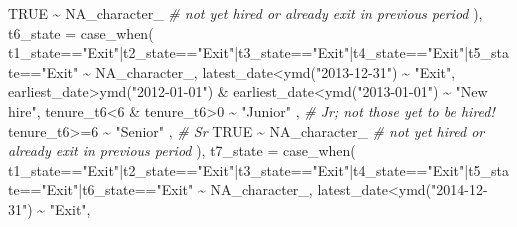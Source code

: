 \documentclass[
]{article}
\newenvironment{Shaded}{\begin{snugshade}}{\end{snugshade}}
\newcommand{\AttributeTok}[1]{\textcolor[rgb]{0.77,0.63,0.00}{#1}}
\newcommand{\CommentTok}[1]{\textcolor[rgb]{0.56,0.35,0.01}{\textit{#1}}}
\newcommand{\ConstantTok}[1]{\textcolor[rgb]{0.00,0.00,0.00}{#1}}
\newcommand{\DecValTok}[1]{\textcolor[rgb]{0.00,0.00,0.81}{#1}}
\newcommand{\FunctionTok}[1]{\textcolor[rgb]{0.00,0.00,0.00}{#1}}
\newcommand{\NormalTok}[1]{#1}
\newcommand{\SpecialCharTok}[1]{\textcolor[rgb]{0.00,0.00,0.00}{#1}}
\newcommand{\StringTok}[1]{\textcolor[rgb]{0.31,0.60,0.02}{#1}}
\begin{document}
\begin{Shaded}
\begin{Highlighting}[]
      \ConstantTok{TRUE}                               \SpecialCharTok{\textasciitilde{}} \ConstantTok{NA\_character\_} \CommentTok{\# not yet hired or already exit in previous period}
\NormalTok{      ),}
    \AttributeTok{t6\_state =} \FunctionTok{case\_when}\NormalTok{(}
\NormalTok{      t1\_state}\SpecialCharTok{==}\StringTok{"Exit"}\SpecialCharTok{|}\NormalTok{t2\_state}\SpecialCharTok{==}\StringTok{"Exit"}\SpecialCharTok{|}\NormalTok{t3\_state}\SpecialCharTok{==}\StringTok{"Exit"}\SpecialCharTok{|}\NormalTok{t4\_state}\SpecialCharTok{==}\StringTok{"Exit"}\SpecialCharTok{|}\NormalTok{t5\_state}\SpecialCharTok{==}\StringTok{"Exit"}                   \SpecialCharTok{\textasciitilde{}} \ConstantTok{NA\_character\_}\NormalTok{,}
\NormalTok{      latest\_date}\SpecialCharTok{\textless{}}\FunctionTok{ymd}\NormalTok{(}\StringTok{"2013{-}12{-}31"}\NormalTok{)        }\SpecialCharTok{\textasciitilde{}} \StringTok{"Exit"}\NormalTok{,}
\NormalTok{      earliest\_date}\SpecialCharTok{\textgreater{}}\FunctionTok{ymd}\NormalTok{(}\StringTok{"2012{-}01{-}01"}\NormalTok{) }
        \SpecialCharTok{\&}\NormalTok{ earliest\_date}\SpecialCharTok{\textless{}}\FunctionTok{ymd}\NormalTok{(}\StringTok{"2013{-}01{-}01"}\NormalTok{) }\SpecialCharTok{\textasciitilde{}} \StringTok{"New hire"}\NormalTok{,}
\NormalTok{      tenure\_t6}\SpecialCharTok{\textless{}}\DecValTok{6} \SpecialCharTok{\&}\NormalTok{ tenure\_t6}\SpecialCharTok{\textgreater{}}\DecValTok{0}          \SpecialCharTok{\textasciitilde{}} \StringTok{"Junior"}\NormalTok{  , }\CommentTok{\# Jr; not those yet to be hired!}
\NormalTok{      tenure\_t6}\SpecialCharTok{\textgreater{}=}\DecValTok{6}                       \SpecialCharTok{\textasciitilde{}} \StringTok{"Senior"}\NormalTok{  , }\CommentTok{\# Sr}
      \ConstantTok{TRUE}                               \SpecialCharTok{\textasciitilde{}} \ConstantTok{NA\_character\_} \CommentTok{\# not yet hired or already exit in previous period}
\NormalTok{      ),}
    \AttributeTok{t7\_state =} \FunctionTok{case\_when}\NormalTok{(}
\NormalTok{      t1\_state}\SpecialCharTok{==}\StringTok{"Exit"}\SpecialCharTok{|}\NormalTok{t2\_state}\SpecialCharTok{==}\StringTok{"Exit"}\SpecialCharTok{|}\NormalTok{t3\_state}\SpecialCharTok{==}\StringTok{"Exit"}\SpecialCharTok{|}\NormalTok{t4\_state}\SpecialCharTok{==}\StringTok{"Exit"}\SpecialCharTok{|}\NormalTok{t5\_state}\SpecialCharTok{==}\StringTok{"Exit"}\SpecialCharTok{|}\NormalTok{t6\_state}\SpecialCharTok{==}\StringTok{"Exit"}                   \SpecialCharTok{\textasciitilde{}} \ConstantTok{NA\_character\_}\NormalTok{,}
\NormalTok{      latest\_date}\SpecialCharTok{\textless{}}\FunctionTok{ymd}\NormalTok{(}\StringTok{"2014{-}12{-}31"}\NormalTok{)        }\SpecialCharTok{\textasciitilde{}} \StringTok{"Exit"}\NormalTok{,}

\end{Highlighting}
\end{Shaded}
\end{document}
